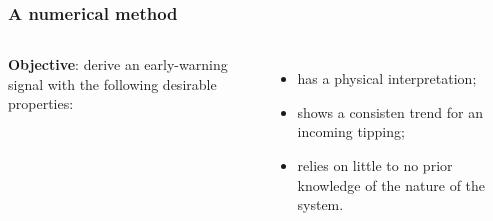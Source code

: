 \documentclass[./main.tex]{subfiles}
\begin{document}
\begin{frame}[label=slide05]
        \frametitle{A numerical method}

        \footnotesize
        \begin{columns}[T]

                \textbf{Objective}: derive an early-warning signal with the following desirable properties:
                \begin{itemize}
                        \item has a physical interpretation;
                        \item shows a consisten trend for an incoming tipping;
                        \item relies on little to no prior knowledge of the nature of the system.
                \end{itemize}

                \medskip

                \begin{enumerate}

                        \medskip

                        \begin{enumerate}
                                \smallskip


                                \smallskip


                                \smallskip

                        \end{enumerate}

                        \medskip

                \end{enumerate}


\end{columns}
\end{frame}
\end{document}
